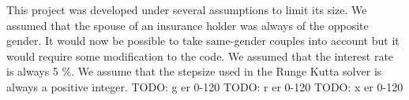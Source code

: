 
This project was developed under several assumptions to limit its size. We assumed that the spouse of an insurance holder was always of the opposite gender. It would now be possible to take same-gender couples into account but it would require some modification to the code. We assumed that the  interest rate is always 5 \%. We assume that the stepsize used in the Runge Kutta solver is always a positive integer. 
TODO: g er 0-120
TODO: r er 0-120
TODO: x er 0-120
